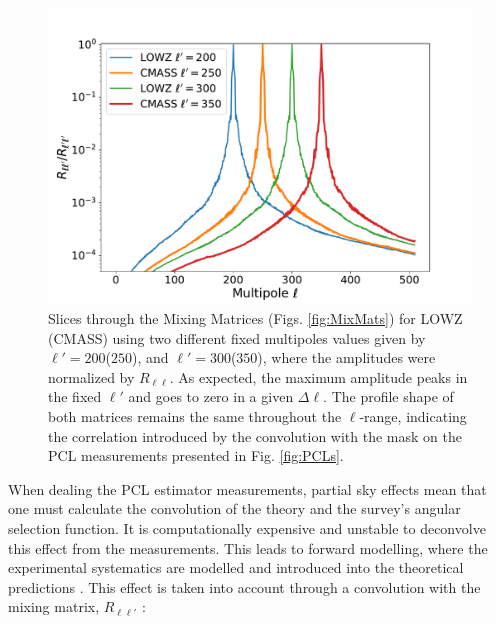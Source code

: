 \begin{figure}
\begin{center}
\includegraphics[scale=0.45]{BOSS-FIGS/Rll_200_300.pdf}
\caption[Slices through the Mixing Matrices.]{Slices through the Mixing Matrices (Figs. \ref{fig:MixMats}) for LOWZ (CMASS) using two different fixed multipoles values given by $\ell'=200$($250$), and $\ell'=300$($350$), where the amplitudes were normalized by $R_{\ell\ell}$. As expected, the maximum amplitude peaks in the fixed $\ell'$ and goes to zero in a given $\Delta\ell$. The profile shape of both matrices remains the same throughout the $\ell$-range, indicating the correlation introduced by the convolution with the mask on the PCL measurements presented in Fig. \ref{fig:PCLs}.}
\label{fig:Rll_slice}
\end{center}
\end{figure}

When dealing the PCL estimator measurements, partial sky effects mean that one must calculate the convolution of the theory and the survey's angular selection function. It is computationally expensive and unstable to deconvolve this effect from the measurements. This leads to forward modelling, where the experimental systematics are modelled and introduced into the theoretical predictions \citep{ScharfLahav1992,FisherLahav1994,Thomas2011}. This effect is taken into account through a convolution with the mixing matrix, $R_{\ell \ell'}$ \citep{Peebles1973_2,PolSpice2001,PolSpice2005,Blake2007}:

